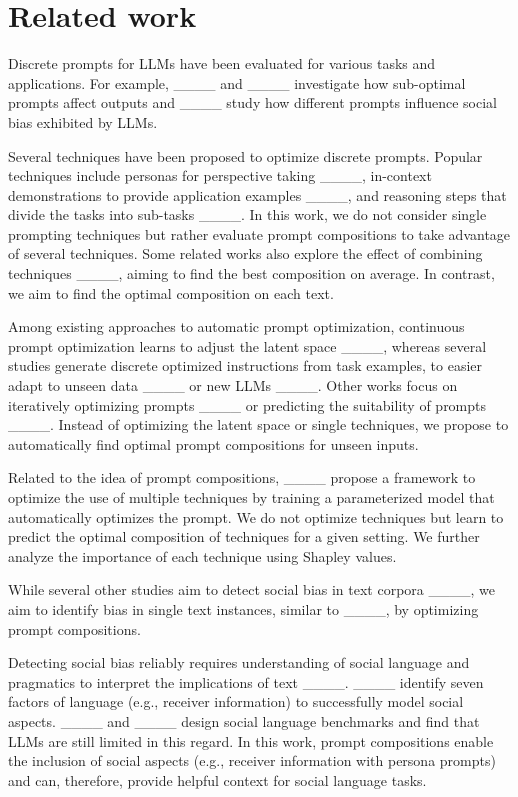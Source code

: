 \section{Related work}
\label{sec:related-work}

Discrete prompts for LLMs have been evaluated for various tasks and applications. For example,  ____ and ____ investigate how sub-optimal prompts affect outputs and ____ study how different prompts influence social bias exhibited by LLMs.

Several techniques have been proposed to optimize discrete prompts. Popular techniques include personas for perspective taking ____, in-context demonstrations to provide application examples ____, and reasoning steps that divide the tasks into sub-tasks ____. In this work, we do not consider single prompting techniques but rather evaluate prompt compositions to take advantage of several techniques. Some related works also explore the effect of combining techniques ____, aiming to find the best composition on average. In contrast, we aim to find the optimal composition on each text.

Among existing approaches to automatic prompt optimization, continuous prompt optimization learns to adjust the latent space ____, whereas several studies generate discrete optimized instructions from task examples, to easier adapt to unseen data ____ or new LLMs ____. Other works focus on iteratively optimizing prompts ____ or predicting the suitability of prompts  ____.
Instead of optimizing the latent space or single techniques, we propose to automatically find optimal prompt compositions for unseen inputs.

Related to the idea of prompt compositions, ____ propose a framework to optimize the use of multiple techniques by training a parameterized model that automatically optimizes the prompt. We do not optimize techniques but learn to predict the optimal composition of techniques for a given setting. We further analyze the importance of each technique using Shapley values.

While several other studies aim to detect social bias in text corpora ____, we aim to identify bias in single text instances, similar to ____, by optimizing prompt compositions.


Detecting social bias reliably requires understanding of social language and pragmatics to interpret the implications of text ____. ____ identify seven factors of language (e.g., receiver information) to successfully model social aspects. ____ and ____ design social language benchmarks and find that LLMs are still limited in this regard. In this work, prompt compositions enable the inclusion of social aspects (e.g., receiver information with persona prompts) and can, therefore, provide helpful context for social language tasks.